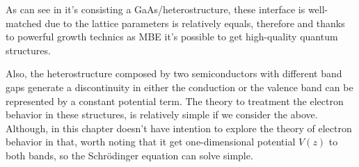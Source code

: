 As can see in  it's consisting a GaAs/\algaas heterostructure, these interface is well-matched due to the lattice parameters is relatively equals, therefore and thanks to powerful growth technics as MBE it's possible to get high-quality quantum structures. 

Also, the heterostructure composed by two semiconductors with different band gaps generate a discontinuity in either the conduction or the valence band can be represented by a constant potential term\cite{harrison2016quantum}.  The theory to treatment the electron behavior in these structures, is relatively simple if we consider the above. 
Although, in this chapter doesn't have intention to explore the theory of electron behavior in that, worth noting that  it get one-dimensional potential $V(z)$ to both bands, so the Schr\"odinger equation can solve simple. 



